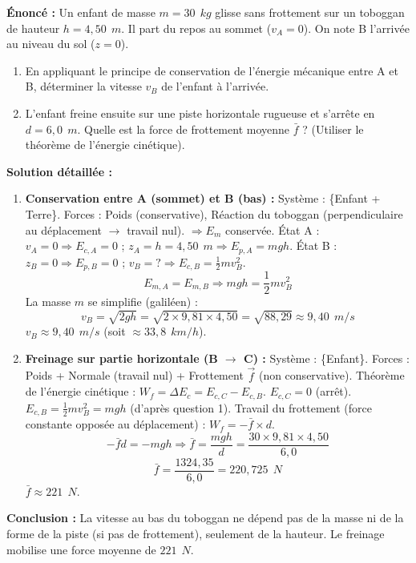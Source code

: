 \documentclass[11pt]{article}
\begin{document}
\begin{exoresolu}
    \textbf{Énoncé :} Un enfant de masse $m = 30\ \SI{}{kg}$ glisse sans frottement sur un toboggan de hauteur $h = 4,50\ \SI{}{m}$. Il part du repos au sommet ($v_A = 0$). On note B l'arrivée au niveau du sol ($z=0$).
    \begin{enumerate}
        \item En appliquant le principe de conservation de l'énergie mécanique entre A et B, déterminer la vitesse $v_B$ de l'enfant à l'arrivée.
        \item L'enfant freine ensuite sur une piste horizontale rugueuse et s'arrête en $d = 6,0\ \SI{}{m}$. Quelle est la force de frottement moyenne $\bar{f}$ ? (Utiliser le théorème de l'énergie cinétique).
    \end{enumerate}
    \tcblower
    \textbf{Solution détaillée :}
    \begin{enumerate}
        \item \textbf{Conservation entre A (sommet) et B (bas) :}
        Système : \{Enfant + Terre\}. Forces : Poids (conservative), Réaction du toboggan (perpendiculaire au déplacement $\rightarrow$ travail nul). $\Rightarrow E_m$ conservée.
        État A : $v_A = 0 \Rightarrow E_{c,A} = 0$ ; $z_A = h = 4,50\ \SI{}{m} \Rightarrow E_{p,A} = mgh$.
        État B : $z_B = 0 \Rightarrow E_{p,B} = 0$ ; $v_B = ? \Rightarrow E_{c,B} = \frac{1}{2}m v_B^2$.
        \[ E_{m,A} = E_{m,B} \Rightarrow m g h = \frac{1}{2} m v_B^2 \]
        La masse $m$ se simplifie (galiléen) :
        \[ v_B = \sqrt{2 g h} = \sqrt{2 \times 9,81 \times 4,50} = \sqrt{88,29} \approx 9,40\ \SI{}{m/s} \]
        $\boxed{v_B \approx 9,40\ \SI{}{m/s}}$ (soit $\approx 33,8\ \SI{}{km/h}$).
        \item \textbf{Freinage sur partie horizontale (B $\to$ C) :}
        Système : \{Enfant\}. Forces : Poids + Normale (travail nul) + Frottement $\vec{f}$ (non conservative).
        Théorème de l'énergie cinétique : $W_{f} = \Delta E_c = E_{c,C} - E_{c,B}$.
        $E_{c,C} = 0$ (arrêt). $E_{c,B} = \frac{1}{2} m v_B^2 = m g h$ (d'après question 1).
        Travail du frottement (force constante opposée au déplacement) : $W_f = - \bar{f} \times d$.
        \[ -\bar{f} d = - m g h \Rightarrow \bar{f} = \frac{m g h}{d} = \frac{30 \times 9,81 \times 4,50}{6,0} \]
        \[ \bar{f} = \frac{1324,35}{6,0} = 220,725\ \SI{}{N} \]
        $\boxed{\bar{f} \approx 221\ \SI{}{N}}$.
    \end{enumerate}
    \textbf{Conclusion :} La vitesse au bas du toboggan ne dépend pas de la masse ni de la forme de la piste (si pas de frottement), seulement de la hauteur. Le freinage mobilise une force moyenne de $221\ \SI{}{N}$.
\end{exoresolu}
\end{document}
